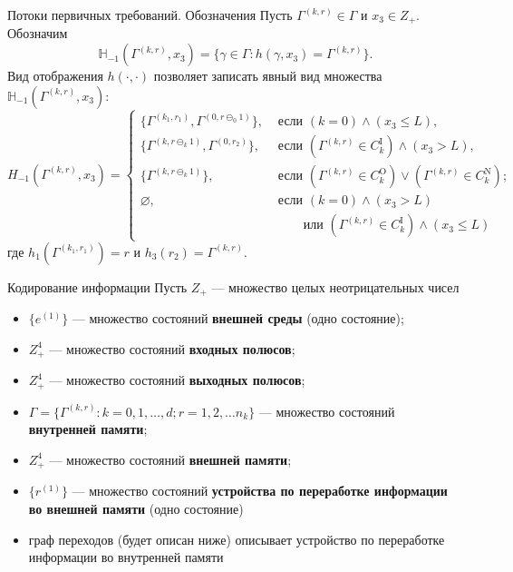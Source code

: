 \documentclass[10pt]{beamer}
\begin{document}
\begin{frame}[allowframebreaks]{Потоки первичных требований. Обозначения}
Пусть $\Gamma^{(k,r)}\in \Gamma$ и $x_3 \in Z_+$. Обозначим 
$$
{\mathbb H}_{-1}(\Gamma^{(k,r)}, x_3) = \{\gamma \in \Gamma \colon h(\gamma, x_3) = \Gamma^{(k,r)}\}.
$$
Вид отображения $h(\cdot,\cdot)$ позволяет записать явный вид множества ${\mathbb H}_{-1}(\Gamma^{(k,r)}, x_3)$:
\begin{equation*}
H_{-1}(\Gamma^{(k,r)}, x_3) = 
\begin{cases}
\bigl\{\Gamma^{(k_1,r_1)}, \Gamma^{(0,r\ominus_0 1)}\bigr\},&  \text{ если  $(k=0) \wedge (x_3 \leqslant L)$,}\\
\bigl\{\Gamma^{(k,r\ominus_k 1)}, \Gamma^{(0,r_2)}\bigr\},&  \text{ если  $(\Gamma^{(k,r)}\in C_k^{\mathrm{I}})
  \wedge (x_3>L)$,}\\ 
\bigl\{\Gamma^{(k,r\ominus_k 1)}\bigr\},&  \text{ если  $(\Gamma^{(k,r)}\in C_k^{\mathrm{O}}) \vee (\Gamma^{(k,r)}\in C_k^{\mathrm{N}})$;}\\
\varnothing,&  \text{ если  $(k = 0)\wedge  (x_3>L)$}\\
 & \qquad \text{ или $(\Gamma^{(k,r)}\in C_k^{\mathrm{I}}) \wedge (x_3\leqslant L)$}
\end{cases}
\end{equation*}
где $h_1(\Gamma^{(k_1,r_1)})=r$ и $h_3(r_2)=\Gamma^{(k,r)}$.
\framebreak

\end{frame}

\begin{frame}{Кодирование информации}
Пусть $Z_+$ --- множество целых неотрицательных чисел
  \begin{itemize}
  \item $\{e^{(1)}\}$ --- множество состояний \textbf{внешней среды} (одно состояние);
  \item $Z^4_+$ --- множество состояний \textbf{входных полюсов};
  \item $Z^4_+$ --- множество состояний \textbf{выходных полюсов};
 \item $\Gamma=\{\Gamma^{(k,r)} \colon k=0,1,\ldots,d; r=1,2,\ldots n_k\}$ --- множество состояний \textbf{внутренней памяти};
   \item $Z^4_+$ --- множество состояний \textbf{внешней памяти};
   \item $\{r^{(1)}\}$ --- множество состояний \textbf{устройства по переработке информации во внешней памяти} (одно состояние)
   \item граф переходов (будет описан ниже) описывает устройство по переработке информации во внутренней памяти
   \end{itemize}
\end{frame}
\end{document}
